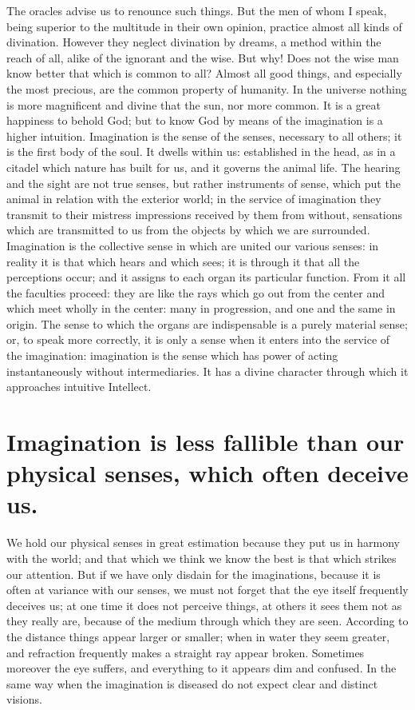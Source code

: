 \documentclass[12pt]{article}
\begin{document}
\noindent The oracles advise us to renounce such things. But the men of whom I
speak, being superior to the multitude in their own opinion, practice almost
all kinds of divination. However they neglect divination by dreams, a method
within the reach of all, alike of the ignorant and the wise. But why! Does not
the wise man know better that which is common to all? Almost all good things,
and especially the most precious, are the common property of humanity. In the
universe nothing is more magnificent and divine that the sun, nor more common.
It is a great happiness to behold God; but to know God by means of the
imagination is a higher intuition. Imagination is the sense of the senses,
necessary to all others; it is the first body of the soul. It dwells within us:
established in the head, as in a citadel which nature has built for us, and it
governs the animal life. The hearing and the sight are not true senses, but
rather instruments of sense, which put the animal in relation with the exterior
world; in the service of imagination they transmit to their mistress
impressions received by them from without, sensations which are transmitted to
us from the objects by which we are surrounded. Imagination is the collective
sense in which are united our various senses: in reality it is that which hears
and which sees; it is through it that all the perceptions occur; and it assigns
to each organ its particular function. From it all the faculties proceed: they
are like the rays which go out from the center and which meet wholly in the
center: many in progression, and one and the same in origin. The sense to which
the organs are indispensable is a purely material sense; or, to speak more
correctly, it is only a sense when it enters into the service of the
imagination: imagination is the sense which has power of acting instantaneously
without intermediaries. It has a divine character through which it approaches
intuitive Intellect.


\section{Imagination is less fallible than our physical senses, which often
deceive us.}

We hold our physical senses in great estimation because they put us in harmony
with the world; and that which we think we know the best is that which strikes
our attention. But if we have only disdain for the imaginations, because it is
often at variance with our senses, we must not forget that the eye itself
frequently deceives us; at one time it does not perceive things, at others it
sees them not as they really are, because of the medium through which they are
seen. According to the distance things appear larger or smaller; when in water
they seem greater, and refraction frequently makes a straight ray appear
broken. Sometimes moreover the eye suffers, and everything to it appears dim
and confused. In the same way when the imagination is diseased do not expect
clear and distinct visions.
\end{document}
